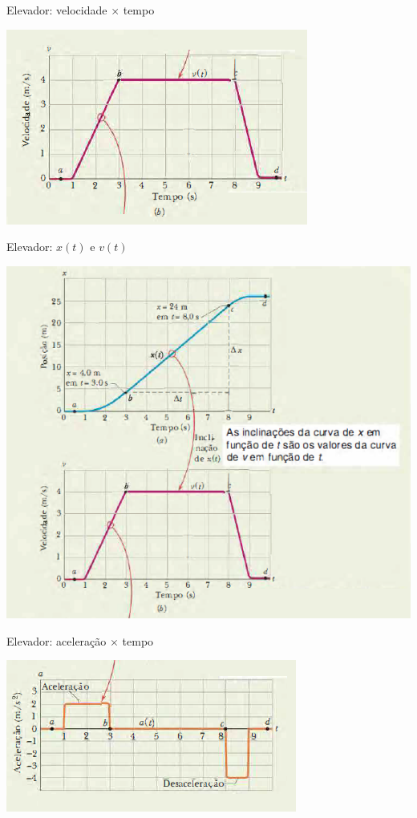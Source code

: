 \documentclass[xcolor=dvipsnames,table]{beamer}
\begin{document}
	\begin{frame}{Elevador: velocidade $\times$ tempo}
		\begin{center}
			\includegraphics[scale=0.7]{images/fig2-6b}
		\end{center}
	\end{frame}
	
	\begin{frame}{Elevador: $x(t)$ e $v(t)$}
		\begin{center}
			\includegraphics[scale=0.6]{images/fig2-6ab}
		\end{center}
	\end{frame}
	
	\begin{frame}{Elevador: aceleração $\times$ tempo}
		\begin{center}
			\includegraphics[scale=0.7]{images/fig2-6c}
		\end{center}
	\end{frame}
	
\end{document}
